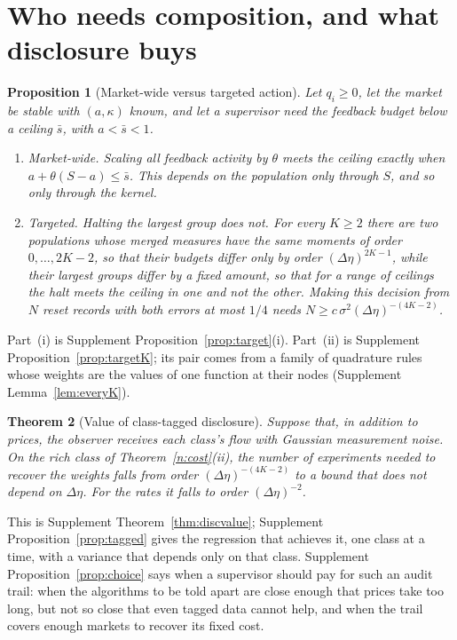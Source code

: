 \documentclass[12pt]{article}
\newtheorem{theorem}{Theorem}[section]
\newtheorem{proposition}[theorem]{Proposition}
\theoremstyle{definition}
\theoremstyle{remark}
\begin{document}
\section{Who needs composition, and what disclosure buys}\label{n:sup}

\begin{proposition}[Market-wide versus targeted action]\label{n:target}
Let $q_i\ge0$, let the market be stable with $(a,\kappa)$ known, and let a supervisor need the feedback budget below a ceiling $\bar s$, with $a<\bar s<1$.
\begin{enumerate}[label=(\roman*),itemsep=1pt]
\item \emph{Market-wide.} Scaling all feedback activity by $\theta$ meets the ceiling exactly when $a+\theta(S-a)\le\bar s$. This depends on the population only through $S$, and so only through the kernel.
\item \emph{Targeted.} Halting the largest group does not. For every $K\ge2$ there are two populations whose merged measures have the same moments of order $0,\ldots,2K-2$, so that their budgets differ only by order $(\Delta\eta)^{2K-1}$, while their largest groups differ by a fixed amount, so that for a range of ceilings the halt meets the ceiling in one and not the other. Making this decision from $N$ reset records with both errors at most $1/4$ needs $N\ge c\,\sigma^2(\Delta\eta)^{-(4K-2)}$.
\end{enumerate}
\end{proposition}

Part~(i) is Supplement Proposition~\ref{prop:target}(i). Part~(ii) is Supplement Proposition~\ref{prop:targetK}; its pair comes from a family of quadrature rules whose weights are the values of one function at their nodes (Supplement Lemma~\ref{lem:everyK}).

\begin{theorem}[Value of class-tagged disclosure]\label{n:disc}
Suppose that, in addition to prices, the observer receives each class's flow with Gaussian measurement noise. On the rich class of Theorem~\ref{n:cost}(ii), the number of experiments needed to recover the weights falls from order $(\Delta\eta)^{-(4K-2)}$ to a bound that does not depend on $\Delta\eta$. For the rates it falls to order $(\Delta\eta)^{-2}$.
\end{theorem}

This is Supplement Theorem~\ref{thm:discvalue}; Supplement Proposition~\ref{prop:tagged} gives the regression that achieves it, one class at a time, with a variance that depends only on that class. Supplement Proposition~\ref{prop:choice} says when a supervisor should pay for such an audit trail: when the algorithms to be told apart are close enough that prices take too long, but not so close that even tagged data cannot help, and when the trail covers enough markets to recover its fixed cost.
\end{document}
